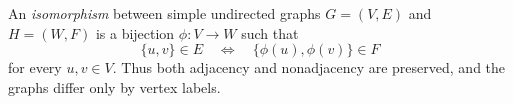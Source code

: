 
An \emph{isomorphism} between simple undirected graphs $G=(V,E)$ and $H=(W,F)$ is a bijection $\phi:V\to W$ such that
\[
\{u,v\}\in E\quad\Longleftrightarrow\quad\{\phi(u),\phi(v)\}\in F
\]
for every $u,v\in V$. Thus both adjacency and nonadjacency are preserved, and the graphs differ only by vertex labels.

